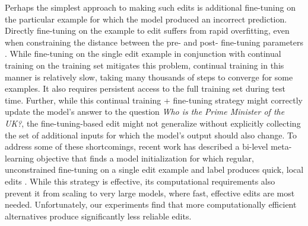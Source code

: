 \documentclass{article}
\begin{document}
Perhaps the simplest approach to making such edits is additional fine-tuning on the particular example for which the model produced an incorrect prediction.
Directly fine-tuning on the example to edit 
suffers from rapid overfitting, even when constraining the distance between the pre- and post- fine-tuning parameters \citep{Cao2021EditingFK}.
While fine-tuning on the single edit example in conjunction with continual training on the training set mitigates this problem,
continual training in this manner is relatively slow, taking many thousands of steps to converge for some examples. It also requires persistent access to the full training set during test time. Further, while this continual training + fine-tuning strategy might correctly update the model's answer to the question \textit{Who is the Prime Minister of the UK?}, the fine-tuning-based edit might not generalize without explicitly collecting the set of additional inputs for which the model's output should also change. 
To address some of these shortcomings, recent work has described a bi-level meta-learning objective that finds a model initialization for which regular, unconstrained fine-tuning on a single edit example and label produces quick, local edits \citep{Sinitsin2020Editable}. While this strategy is effective, its computational requirements also prevent it from scaling to very large models, where fast, effective edits are most needed. Unfortunately, our experiments find that more computationally efficient alternatives produce significantly less reliable edits.
\end{document}
